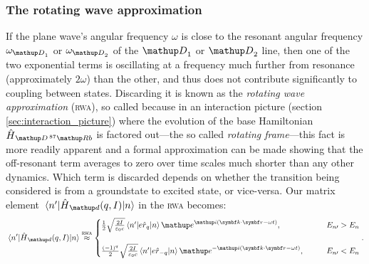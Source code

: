 \subsubsection{The rotating wave approximation}
If the plane wave's angular frequency $\omega$ is close to the resonant angular frequency $\omega_{\up{D}_1}$ or $\omega_{\up{D}_2}$ of the $\up{D}_1$ or $\up{D}_2$ line, then one of the two exponential terms is oscillating at a frequency much further from resonance (approximately $2\omega$) than the other, and thus does not contribute significantly to coupling between states. Discarding it is known as the \emph{rotating wave approximation} (\textsc{rwa}), so called because in an interaction picture (section \ref{sec:interaction_picture}) where the evolution of the base Hamiltonian $\hat H_{\up{D}\,^{87}\up{Rb}}$ is factored out---the so called \emph{rotating frame}---this fact is more readily apparent and a formal approximation can be made showing that the off-resonant term averages to zero over time scales much shorter than any other dynamics. Which term is discarded depends on whether the transition being considered is from a groundstate to excited state, or vice-versa. Our matrix element $\matrixel{n^\prime}{\hat H_\up{d}(q,I)}{n}$ in the \textsc{rwa} becomes:
\begin{align}\label{eq:rwa_no_rabifreq}
\matrixel{n^\prime}{\hat H_\up{d}(q,I)}{n} \overset{\textsc{rwa}}\approx
\begin{cases}
\frac12\sqrt{\frac{2I}{\varepsilon_0 c}}
\matrixel{n^\prime}
  {e\hat r_q}
  {n}\ee^{\ii(\vec k \cdot \vec r - \omega t)},\qquad &E_{n\prime} > E_n\\
\\
\frac{(-1)^q}2\sqrt{\frac{2I}{\varepsilon_0 c}}
\matrixel{n^\prime}
  {e\hat r_{-q}}
  {n} \ee^{-\ii(\vec k \cdot \vec r - \omega t)},\qquad &E_{n\prime} < E_n
\end{cases}.
\end{align}

